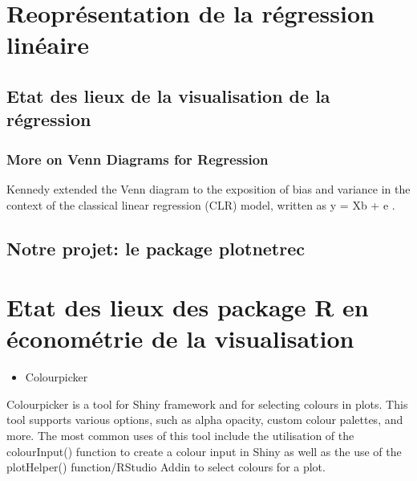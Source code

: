 \documentclass[
]{report}
\providecommand{\tightlist}{%
  \setlength{\itemsep}{0pt}\setlength{\parskip}{0pt}}
\begin{document}
\hypertarget{reopruxe9sentation-de-la-ruxe9gression-linuxe9aire}{%
\chapter{Reoprésentation de la régression linéaire}\label{reopruxe9sentation-de-la-ruxe9gression-linuxe9aire}}

\hypertarget{etat-des-lieux-de-la-visualisation-de-la-ruxe9gression}{%
\section{Etat des lieux de la visualisation de la régression}\label{etat-des-lieux-de-la-visualisation-de-la-ruxe9gression}}

\hypertarget{more-on-venn-diagrams-for-regression}{%
\subsection{More on Venn Diagrams for Regression}\label{more-on-venn-diagrams-for-regression}}

Kennedy \citep{kennedy} extended the Venn diagram to the exposition of bias and variance in the context of the classical linear regression (CLR) model, written as y = Xb + e .

\hypertarget{notre-projet-le-package-plotnetrec-1}{%
\section{Notre projet: le package plotnetrec}\label{notre-projet-le-package-plotnetrec-1}}

\hypertarget{etat-des-lieux-des-package-r-en-uxe9conomuxe9trie-de-la-visualisation}{%
\chapter{Etat des lieux des package R en économétrie de la visualisation}\label{etat-des-lieux-des-package-r-en-uxe9conomuxe9trie-de-la-visualisation}}

\begin{itemize}
\tightlist
\item
  Colourpicker
\end{itemize}

Colourpicker is a tool for Shiny framework and for selecting colours in plots. This tool supports various options, such as alpha opacity, custom colour palettes, and more. The most common uses of this tool include the utilisation of the colourInput() function to create a colour input in Shiny as well as the use of the plotHelper() function/RStudio Addin to select colours for a plot.
\end{document}
